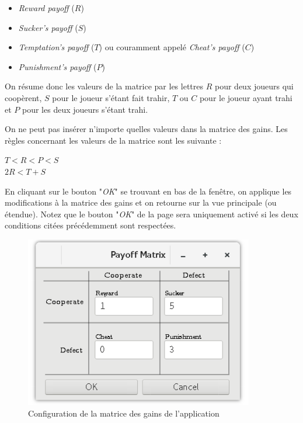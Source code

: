 \documentclass[a4paper, french]{article}
\begin{document}
\begin{itemize}
    \item \textit{Reward payoff} ($R$)
    \item \textit{Sucker's payoff} ($S$)
    \item \textit{Temptation's payoff} ($T$) ou couramment appelé \textit{Cheat's payoff} ($C$) 
    \item \textit{Punishment's payoff} ($P$)
\end{itemize}

On résume donc les valeurs de la matrice par les lettres $R$ pour deux joueurs qui coopèrent, $S$ pour le joueur s'étant fait trahir, $T$ ou $C$ pour le joueur ayant trahi et $P$ pour les deux joueurs s'étant trahi.

On ne peut pas insérer n'importe quelles valeurs dans la matrice des gains. Les règles concernant les valeurs de la matrice sont les suivante :

\begin{framed}
    \centering
    $T < R < P < S$\\
    $2R < T + S$
\end{framed}

En cliquant sur le bouton "\textit{OK}" se trouvant en bas de la fenêtre, on applique les modifications à la matrice des gains et on retourne sur la vue principale (ou étendue). Notez que le bouton "\textit{OK}" de la page sera uniquement activé si les deux conditions citées précédemment sont respectées.

\vfill
\begin{figure}[htp]
    \centering
    \includegraphics[width=10cm]{interface/payoffmatrix.png}
    \caption{Configuration de la matrice des gains de l'application}
\end{figure}
\vfill

\pagebreak
\end{document}
